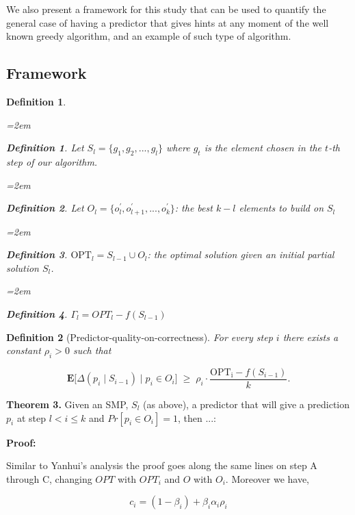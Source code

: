 \documentclass{article}
\newtheorem{definition}{Definition}
\newtheorem{subdefinitioninner}{Definition}[definition]
\newenvironment{subdefinition}
  {\begin{list}{}{\leftmargin=2em}
   \item\begin{subdefinitioninner}}
  {\end{subdefinitioninner}\end{list}}
\begin{document}
We also present a framework for this study that can be used to quantify the general case of having a predictor that gives hints at any moment of the well known greedy algorithm, and an example of such type of algorithm.

\subsection{Framework}

\begin{definition}
    \begin{subdefinition}
        Let $S_l = \{g_1, g_2, ..., g_l\}$ where $g_t$ is the element chosen in the $t$-th step of our algorithm. 
    \end{subdefinition}
    \begin{subdefinition}
        Let $O_l = \{o^{'}_{l}, o^{'}_{l + 1}, ..., o^{'}_{k}\}$: the best $k-l$ elements to build on $S_l$
    \end{subdefinition}
    \begin{subdefinition}
        $\mathrm{OPT}_l = S_{l-1} \cup O_l$: the optimal solution given an initial partial solution $S_l$.
    \end{subdefinition}
    \begin{subdefinition}
            $\Gamma_l = OPT_l - f(S_{l-1})$
    \end{subdefinition}
\end{definition}




    

\begin{definition}[Predictor-quality-on-correctness]
    For every step $i$ there exists a constant $\rho_i>0$ such that

    $$\mathbf{E}\big[\Delta(p_i\mid S_{i-1}) \mid p_i\in O_i\big]\;\ge\; \rho_i\cdot\frac{\mathrm{OPT_i}-f(S_{i-1})}{k}.$$
\end{definition}




\textbf{Theorem 3.} Given an SMP, $S_l$ (as above), a predictor that will give a prediction $p_i$ at step $l < i \leq k$ and $Pr[p_i \in O_i] = 1$, then ...:


\textbf{Proof:}

Similar to Yanhui's analysis the proof goes along the same lines on step A through C, changing $OPT$ with $OPT_i$ and $O$ with $O_i$. Moreover we have,

\[
c_i = (1 - \beta_i) +\beta_i\alpha_i\rho_i \tag{*}
\]
\end{document}
